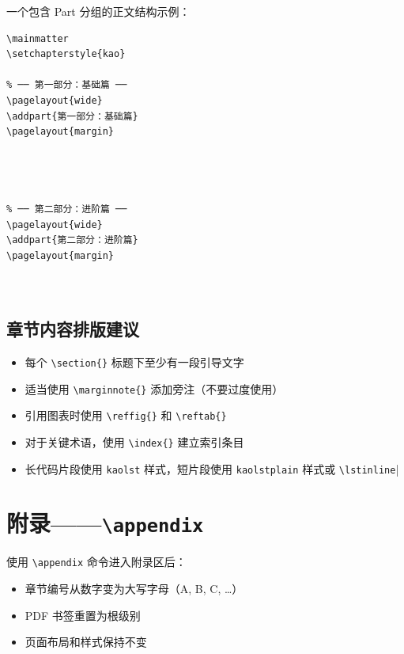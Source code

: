一个包含 Part 分组的正文结构示例：

\begin{lstlisting}
\mainmatter
\setchapterstyle{kao}

% ── 第一部分：基础篇 ──
\pagelayout{wide}
\addpart{第一部分：基础篇}
\pagelayout{margin}




% ── 第二部分：进阶篇 ──
\pagelayout{wide}
\addpart{第二部分：进阶篇}
\pagelayout{margin}



\end{lstlisting}

\subsection{章节内容排版建议}

\begin{itemize}
    \item 每个 \lstinline|\section{}| 标题下至少有一段引导文字
    \item 适当使用 \lstinline|\marginnote{}| 添加旁注（不要过度使用）
    \item 引用图表时使用 \lstinline|\reffig{}| 和 \lstinline|\reftab{}|
    \item 对于关键术语，使用 \lstinline|\index{}| 建立索引条目
    \item 长代码片段使用 \texttt{kaolst} 样式，短片段使用
\texttt{kaolstplain} 样式或 \lstinline|\lstinline||
\end{itemize}


\section{附录——\texttt{\textbackslash appendix}}


使用 \lstinline|\appendix| 命令进入附录区后：
\begin{itemize}
    \item 章节编号从数字变为大写字母（A, B, C, \ldots{}）
    \item PDF 书签重置为根级别
    \item 页面布局和样式保持不变
\end{itemize}

